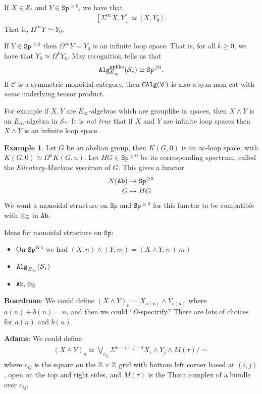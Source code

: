 \documentclass[12pt]{amsart}
\theoremstyle{definition}
\newtheorem{example}[theorem]{Example}
\let\smashprod\wedge
\providecommand{\Sp}{\texttt{Sp}}
\providecommand{\Sp}{\text{Sp}}
\begin{document}
If $X\in \mathcal{S}_\ast$ and $Y\in \Sp^{\ge0}$, we have that
\begin{align*}
    \left[ \Sigma^\infty X, Y \right]\simeq \left[ X, Y_0 \right].
\end{align*}
That is, $\Omega^\infty Y \simeq Y_0$.

If $Y \in \Sp^{\ge 0}$ then $\Omega^\infty Y = Y_0$ is an infinite loop space. That is, for all $k\ge 0$, we have that $Y_0 \simeq \Omega^k Y_k$. May recognition tells us that
\begin{align*}
    \Alg_{E_\infty}^{\text{gplike}}(\mathcal{S}_\ast) \simeq \Sp^{\ge 0}.
\end{align*}
If $\mathscr{C}$ is a symmetric monoidal category, then $\texttt{CAlg}(\mathscr{C})$ is also a sym mon cat with \textit{some} underlying tensor product.

For example if $X,Y$ are $E_\infty$-algebras which are grouplike in spaces, then $X \smashprod Y$ is an $E_\infty$-algebra in $\mathcal{S}_\ast$. It is \textit{not true} that if $X$ and $Y$ are infinite loop spaces then $X \smashprod Y$ is an infinite loop space.

\begin{example} Let $G$ be an abelian group, then $K(G,0)$ is an $\infty$-loop space, with $K(G,0)\simeq \Omega^n K(G,n)$. Let $HG \in \Sp^{\ge 0}$ be its corresponding spectrum, called the \textit{Eilenberg-Maclane spectrum} of $G$. This gives a functor
\begin{align*}
    N(\Ab) &\to \Sp^{\ge 0} \\
    G &\mapsto HG.
\end{align*}
We want a monoidal structure on $\Sp$ and $\Sp^{\ge 0}$ for this functor to be compatible with $\otimes_{\mathbb{Z}}$ in $\texttt{Ab}$.
\end{example}

Ideas for monoidal structure on $\Sp$:
\begin{itemize}
    \item On $\Sp^\text{Wh}$ we had $(X,n) \smashprod (Y,m) = (X \smashprod Y, n+m)$
    \item $\texttt{Alg}_{E_\infty}(\mathcal{S}_\ast)$
    \item $\texttt{Ab},\otimes_{\mathbb{Z}}$    
\end{itemize}

\textbf{Boardman}: We could define $(X \smashprod Y)_n = X_{a(n)} \smashprod Y_{b(n)}$ where $a(n)+b(n) = n$, and then we could ``$\Omega$-spectrify.'' There are lots of choices for $a(n)$ and $b(n)$.

\textbf{Adams}: We could define
\begin{align*}
    (X \smashprod Y)_n \simeq \bigvee_{e_{ij}} \Sigma^{n-i-j-d} X_i \smashprod Y_j \smashprod M(\tau) \big/ \sim
\end{align*}
where $e_{ij}$ is the square on the $\mathbb{Z} \times \mathbb{Z}$ grid with bottom left corner based at $(i,j)$, open on the top and right sides, and $M(\tau)$ is the Thom complex of a bundle over $e_{ij}$.
\end{document}
